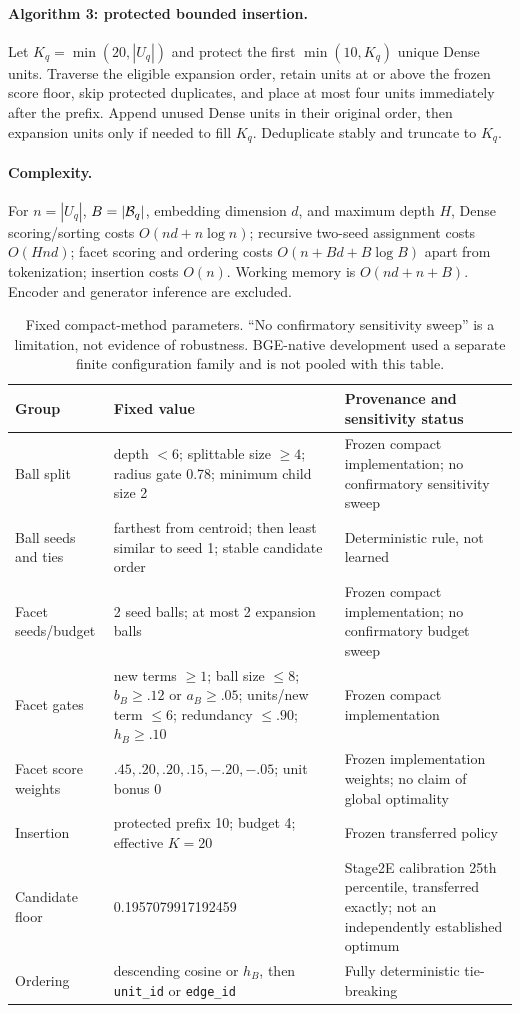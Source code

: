 \documentclass[11pt]{article}
\begin{document}
\paragraph{Algorithm 3: protected bounded insertion.}
Let $K_q=\min(20,|U_q|)$ and protect the first $\min(10,K_q)$ unique Dense
units. Traverse the eligible expansion order, retain units at or above the
frozen score floor, skip protected duplicates, and place at most four units
immediately after the prefix. Append unused Dense units in their original
order, then expansion units only if needed to fill $K_q$. Deduplicate stably
and truncate to $K_q$.

\paragraph{Complexity.}
For $n=|U_q|$, $B=|{\cal B}_q|$, embedding dimension $d$, and maximum depth
$H$, Dense scoring/sorting costs $O(nd+n\log n)$; recursive two-seed
assignment costs $O(Hnd)$; facet scoring and ordering costs
$O(n+Bd+B\log B)$ apart from tokenization; insertion costs $O(n)$. Working
memory is $O(nd+n+B)$. Encoder and generator inference are excluded.

\begin{table}[h]
\centering
\scriptsize
\setlength{\tabcolsep}{3pt}
\begin{tabular}{@{}p{}p{}p{}@{}}
\toprule
Group & Fixed value & Provenance and sensitivity status \\
\midrule
Ball split & depth $<6$; splittable size $\geq4$; radius gate 0.78;
minimum child size 2 & Frozen compact implementation; no confirmatory
sensitivity sweep \\
Ball seeds and ties & farthest from centroid; then least similar to seed 1;
stable candidate order & Deterministic rule, not learned \\
Facet seeds/budget & 2 seed balls; at most 2 expansion balls & Frozen compact
implementation; no confirmatory budget sweep \\
Facet gates & new terms $\geq1$; ball size $\leq8$; $b_B\geq.12$ or
$a_B\geq.05$; units/new term $\leq6$; redundancy $\leq.90$; $h_B\geq.10$ &
Frozen compact implementation \\
Facet score weights & $.45,.20,.20,.15,-.20,-.05$; unit bonus 0 & Frozen
implementation weights; no claim of global optimality \\
Insertion & protected prefix 10; budget 4; effective $K=20$ & Frozen
transferred policy \\
Candidate floor & 0.1957079917192459 & Stage2E calibration 25th percentile,
transferred exactly; not an independently established optimum \\
Ordering & descending cosine or $h_B$, then \texttt{unit\_id} or
\texttt{edge\_id} & Fully deterministic tie-breaking \\
\bottomrule
\end{tabular}
\caption{Fixed compact-method parameters. ``No confirmatory sensitivity
sweep'' is a limitation, not evidence of robustness. BGE-native development
used a separate finite configuration family and is not pooled with this table.}
\label{tab:parameters}
\end{table}
\end{document}
